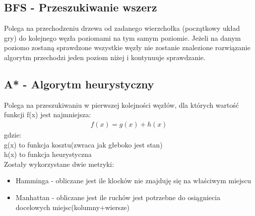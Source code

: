 \documentclass{classrep}
\begin{document}
{        \subsection{BFS - Przeszukiwanie wszerz} {
            Polega na przechodzeniu drzewa od zadanego wierzchołka (początkowy układ gry)
            do kolejnego węzła poziomami na tym samym poziomie. Jeżeli na danym poziomo
            zostaną sprawdzone wszystkie węzły nie zostanie znalezione rozwiązanie algorytm
            przechodzi jeden poziom niżej i kontynuuje sprawdzanie.
        }

        \subsection{A* - Algorytm heurystyczny} {
            Polega na przeszukiwaniu w pierwszej kolejności węzłów, dla których wartość funkcji
            f(x) jest najmniejsza:
            \begin{align*}
                f(x)=g(x)+h(x)
            \end{align*}
            gdzie:\\
            g(x) to funkcja kosztu(zwraca jak głeboko jest stan)\\
            h(x) to funkcja heurystyczna\\

            Zostały wykorzystane dwie metryki:
            \begin{itemize}
                \item{Hamminga} - obliczane jest ile klocków nie znajduję się na właściwym miejscu
                \item{Manhattan} - obliczane jest ile ruchów jest potrzebne do osiągniecia
                docelowych miejsc(kolumny+wiersze)
            \end{itemize}
        }
    }
\end{document}
